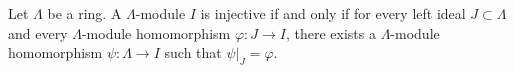 Let $\Lambda$ be a ring. A $\Lambda$-module $I$ is injective if and only if for every left ideal $J \subset \Lambda$ and every $\Lambda$-module homomorphism $\varphi: J \to I$, there exists a $\Lambda$-module homomorphism $\psi: \Lambda \to I$ such that $\psi|_J = \varphi$.

